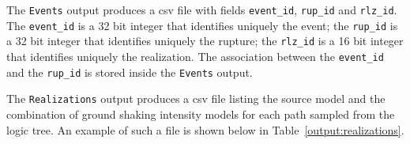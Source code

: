 The \texttt{Events} output produces a csv file with fields \texttt{event\_id},
\texttt{rup\_id} and \texttt{rlz\_id}. The \texttt{event\_id} is a 32 bit
integer that identifies uniquely the event; the \texttt{rup\_id}
is a 32 bit integer that identifies uniquely the rupture; the \texttt{rlz\_id}
is a 16 bit integer that identifies uniquely the
realization. The association between the \texttt{event\_id} and
the  \texttt{rup\_id} is stored inside the \texttt{Events} output.

The \texttt{Realizations} output produces a csv file listing the source model
and the combination of ground shaking intensity models for each path sampled
from the logic tree. An example of such a file is shown below in
Table~\ref{output:realizations}.


